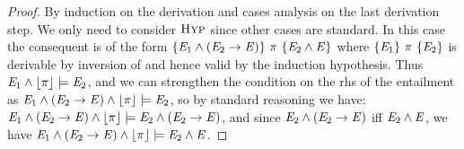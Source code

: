 \begin{proof}
  By induction on the derivation and cases analysis on the last derivation
  step. We only need to consider $\text{\sc Hyp}$ since other cases are standard.
  In this case the consequent is of the form
  $\{ \mathit{E}_1 \wedge (\mathit{E}_2 \rightarrow \mathit{E}) \}\ \pi\ \{ \mathit{E}_2 \wedge \mathit{E} \}$
  where $\{ \mathit{E}_1 \}\ \pi\ \{ \mathit{E}_2 \}$ is derivable by inversion
  of  and hence valid by the induction hypothesis.
  Thus $\mathit{E}_1 \wedge \lfloor \pi \rfloor \models \mathit{E}_2$,
  and we can strengthen the condition on the rhs of the entailment as $
  \mathit{E}_1 \wedge (\mathit{E}_2 \rightarrow \mathit{E}) \wedge \lfloor \pi \rfloor \models \mathit{E}_2 
  $,
  so by standard reasoning we have:
  $
  \mathit{E}_1 \wedge (\mathit{E}_2 \rightarrow \mathit{E}) \wedge \lfloor \pi \rfloor \models \mathit{E}_2 \wedge (\mathit{E}_2 \rightarrow \mathit{E})
  $,
  and since $\mathit{E}_2 \wedge (\mathit{E}_2 \rightarrow \mathit{E})$ iff
  $\mathit{E}_2 \wedge \mathit{E}$, we have
  $\mathit{E}_1 \wedge (\mathit{E}_2 \rightarrow \mathit{E}) \wedge \lfloor \pi \rfloor \models \mathit{E}_2 \wedge \mathit{E}$.
\end{proof}

